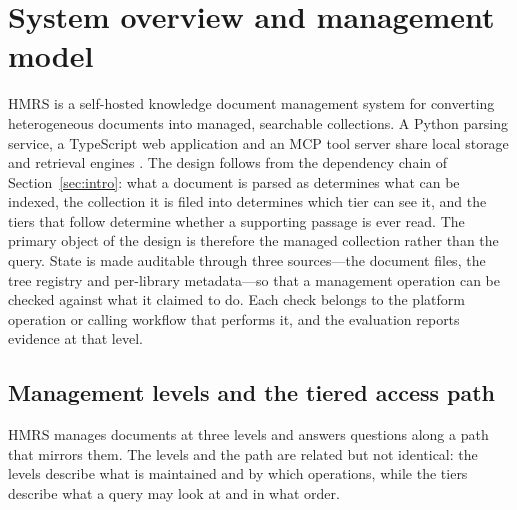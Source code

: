 \section{System overview and management model}
\label{sec:system}

HMRS is a self-hosted knowledge document management system for converting
heterogeneous documents into managed, searchable collections. A Python
parsing service, a TypeScript web application and an MCP tool server share
local storage and retrieval engines \cite{mcp}. The design follows from the
dependency chain of Section~\ref{sec:intro}: what a document is parsed as
determines what can be indexed, the collection it is filed into determines
which tier can see it, and the tiers that follow determine whether a
supporting passage is ever read. The primary object of the design is therefore
the managed collection rather than the query. State is made auditable through
three sources---the document files, the tree registry and per-library
metadata---so that a management operation can be checked against what it
claimed to do. Each check belongs to the platform operation or calling
workflow that performs it, and the evaluation reports evidence at that level.

\subsection{Management levels and the tiered access path}
\label{sec:levels}

HMRS manages documents at three levels and answers questions along a path that
mirrors them. The levels and the path are related but not identical: the
levels describe what is maintained and by which operations, while the tiers
describe what a query may look at and in what order.

